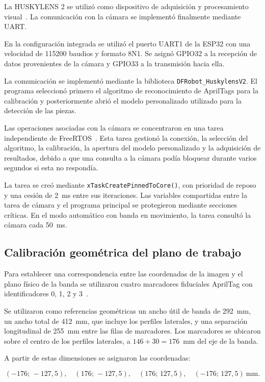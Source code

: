 La HUSKYLENS 2 se utilizó como dispositivo de adquisición y procesamiento visual~\cite{dfrobotHuskylens2}. La comunicación con la cámara se implementó finalmente mediante UART.

En la configuración integrada se utilizó el puerto UART1 de la ESP32 con una velocidad de 115200 baudios y formato 8N1. Se asignó GPIO32 a la recepción de datos provenientes de la cámara y GPIO33 a la transmisión hacia ella.

La comunicación se implementó mediante la biblioteca \texttt{DFRobot\_HuskylensV2}. El programa seleccionó primero el algoritmo de reconocimiento de AprilTags para la calibración y posteriormente abrió el modelo personalizado utilizado para la detección de las piezas.

Las operaciones asociadas con la cámara se concentraron en una tarea independiente de FreeRTOS~\cite{barry2016freertos}. Esta tarea gestionó la conexión, la selección del algoritmo, la calibración, la apertura del modelo personalizado y la adquisición de resultados, debido a que una consulta a la cámara podía bloquear durante varios segundos si esta no respondía.

La tarea se creó mediante \texttt{xTaskCreatePinnedToCore()}, con prioridad de reposo y una cesión de 2~ms entre sus iteraciones. Las variables compartidas entre la tarea de cámara y el programa principal se protegieron mediante secciones críticas. En el modo automático con banda en movimiento, la tarea consultó la cámara cada 50~ms.


\subsection{Calibración geométrica del plano de trabajo}

Para establecer una correspondencia entre las coordenadas de la imagen y el plano físico de la banda se utilizaron cuatro marcadores fiduciales AprilTag con identificadores 0, 1, 2 y 3~\cite{olson2011apriltag}.

Se utilizaron como referencias geométricas un ancho útil de banda de 292~mm, un ancho total de 412~mm, que incluye los perfiles laterales, y una separación longitudinal de 255~mm entre las filas de marcadores. Los marcadores se ubicaron sobre el centro de los perfiles laterales, a $146+30=176$~mm del eje de la banda.

A partir de estas dimensiones se asignaron las coordenadas:

\[
(-176;\,-127{,}5), \quad
(176;\,-127{,}5), \quad
(176;\,127{,}5), \quad
(-176;\,127{,}5)\ \text{mm}.
\]

